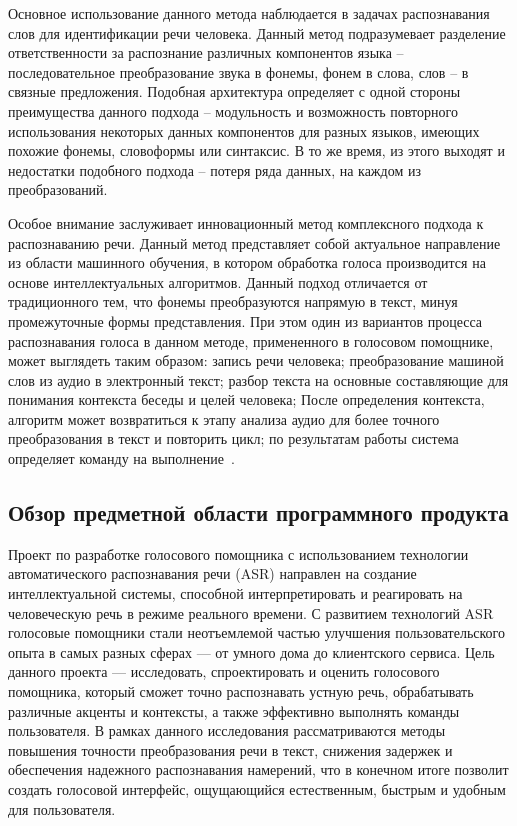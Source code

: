 Основное использование данного метода наблюдается в задачах распознавания слов для идентификации речи человека. Данный метод подразумевает разделение ответственности за распознание различных компонентов языка – последовательное преобразование звука в фонемы, фонем в слова, слов – в связные предложения. Подобная архитектура определяет с одной стороны преимущества данного подхода – модульность и возможность повторного использования некоторых данных компонентов для разных языков, имеющих похожие фонемы, словоформы или синтаксис. В то же время, из этого выходят и недостатки подобного подхода – потеря ряда данных, на каждом из преобразований.

Особое внимание заслуживает инновационный метод комплексного подхода к распознаванию речи. Данный метод представляет собой актуальное направление из области машинного обучения, в котором обработка голоса
производится на основе интеллектуальных алгоритмов. Данный подход отличается от традиционного тем, что фонемы преобразуются напрямую в текст, минуя промежуточные формы представления. При этом один из вариантов процесса распознавания голоса в данном методе, примененного в голосовом помощнике, может выглядеть таким образом: запись речи человека; преобразование машиной слов из аудио в электронный текст; разбор текста на основные составляющие для понимания контекста беседы и целей человека; После определения контекста, алгоритм может возвратиться к этапу анализа аудио для более точного преобразования в текст и повторить цикл; по результатам работы система определяет команду на выполнение~\cite{Abougarair}.

\subsection{Обзор предметной области программного продукта}

Проект по разработке голосового помощника с использованием технологии автоматического распознавания речи (ASR) направлен на создание интеллектуальной системы, способной интерпретировать и реагировать на человеческую речь в режиме реального времени. С развитием технологий ASR голосовые помощники стали неотъемлемой частью улучшения пользовательского опыта в самых разных сферах — от умного дома до клиентского сервиса. Цель данного проекта — исследовать, спроектировать и оценить голосового помощника, который сможет точно распознавать устную речь, обрабатывать различные акценты и контексты, а также эффективно выполнять команды пользователя. В рамках данного исследования рассматриваются методы повышения точности преобразования речи в текст, снижения задержек и обеспечения надежного распознавания намерений, что в конечном итоге позволит создать голосовой интерфейс, ощущающийся естественным, быстрым и удобным для пользователя.

